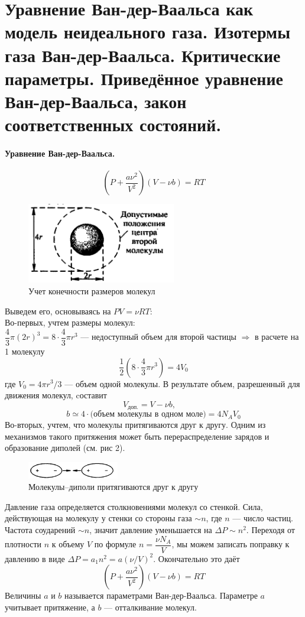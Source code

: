 \section{\normalsize Уравнение Ван-дер-Ваальса как модель неидеального газа. Изотермы газа Ван-дер-Ваальса. Критические параметры. Приведённое уравнение Ван-дер-Ваальса, закон соответственных состояний.}
\paragraph{Уравнение Ван-дер-Ваальса.}
$$\left(P+\dfrac{a\nu^2}{V^2}\right)\left(V-\nu b\right)=RT$$

\begin{figure}
	\includegraphics[width=65mm]{ris19.png}
	\caption{Учет конечности размеров молекул}
\end{figure}
Выведем его, основываясь на $PV=\nu RT$:\\
Во-первых, учтем размеры молекул: \\$\dfrac{4}{3}\pi(2r)^3=8\cdot\dfrac{4}{3}\pi r^3$ --- недоступный объем для второй частицы $\Rightarrow$ в расчете на 1 молекулу $$\dfrac{1}{2}(8\cdot\dfrac{4}{3}\pi r^3)=4V_0$$
где $V_0=4\pi r^3/3$ --- объем одной молекулы. 
В результате объем, разрешенный для движения молекул, cоставит
$$V_\text{доп.} =V-\nu b,\quad$$
$$ b\simeq4\cdot\text{(объем молекулы в одном моле)}=4N_AV_0$$
Во-вторых, учтем, что молекулы притягиваются друг к другу. Одним из механизмов такого притяжения может быть перераспределение зарядов и образование диполей (см. рис 2).

\begin{figure}
	\label{dipol}
	\includegraphics[width=40mm]{ris19_2.png}
	\caption{\small Молекулы--диполи притягиваются друг к другу}
\end{figure}
Давление газа определяется столкновениями молекул со стенкой. Сила, действующая на молекулу у стенки со стороны газа $\sim n$, где $n$ --- число частиц. Частота соударений $\sim n$, значит давление уменьшается на $\Delta P\sim n^2$. Переходя от плотности $n$ к объему $V$ по формуле $n=\dfrac{\nu N_A}{V}$, мы можем записать поправку к давлению в виде $\Delta P=a_1n^2=a(\nu/V)^2.$ Окончательно это даёт
$$\left(P+\dfrac{a\nu^2}{V^2}\right)\left(V-\nu b\right)=RT$$
Величины $a$ и $b$ называется параметрами Ван-дер-Ваальса. Параметре $a$ учитывает притяжение, а $b$ --- отталкивание молекул.
